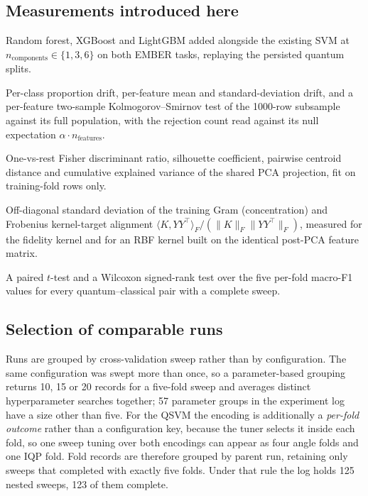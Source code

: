 \documentclass[11pt]{article}
\newcommand{\nc}{\ensuremath{n_{\mathrm{components}}}}
\begin{document}
\subsection{Measurements introduced here}

\begin{description}[leftmargin=1.2em,style=nextline]
\item[Complete classical baseline] Random forest, XGBoost and LightGBM added
alongside the existing SVM at $\nc{} \in \{1,3,6\}$ on both EMBER tasks, replaying
the persisted quantum splits.
\item[Subsample representativeness] Per-class proportion drift, per-feature mean
and standard-deviation drift, and a per-feature two-sample Kolmogorov--Smirnov
test of the 1000-row subsample against its full population, with the rejection
count read against its null expectation $\alpha \cdot n_{\mathrm{features}}$.
\item[Class separability] One-vs-rest Fisher discriminant ratio, silhouette
coefficient, pairwise centroid distance and cumulative explained variance of the
shared PCA projection, fit on training-fold rows only.
\item[Kernel diagnostics] Off-diagonal standard deviation of the training Gram
(concentration) and Frobenius kernel-target alignment
$\langle K, YY^{\!\top}\rangle_F / (\lVert K\rVert_F \lVert YY^{\!\top}\rVert_F)$,
measured for the fidelity kernel and for an RBF kernel built on the identical
post-PCA feature matrix.
\item[Paired significance] A paired $t$-test and a Wilcoxon signed-rank test over
the five per-fold macro-F1 values for every quantum--classical pair with a
complete sweep.
\end{description}

\subsection{Selection of comparable runs}
\label{sec:selection}

Runs are grouped by cross-validation sweep rather than by configuration. The same
configuration was swept more than once, so a parameter-based grouping returns 10,
15 or 20 records for a five-fold sweep and averages distinct hyperparameter
searches together; 57 parameter groups in the experiment log have a size other
than five. For the QSVM the encoding is additionally a \emph{per-fold outcome}
rather than a configuration key, because the tuner selects it inside each fold,
so one sweep tuning over both encodings can appear as four angle folds and one
IQP fold. Fold records are therefore grouped by parent run, retaining only sweeps
that completed with exactly five folds. Under that rule the log holds 125 nested
sweeps, 123 of them complete.
\end{document}
